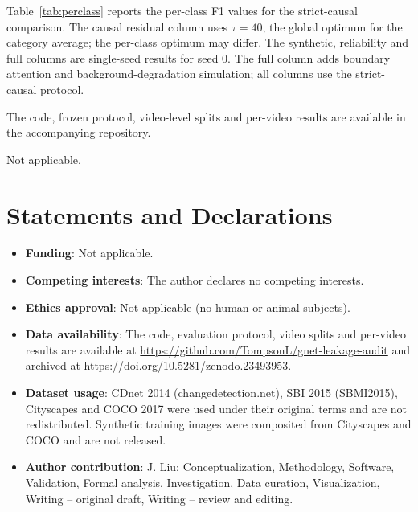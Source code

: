 \documentclass[sn-mathphys-num,iicol]{sn-jnl}
\begin{document}
Table~\ref{tab:perclass} reports the per-class F1 values for the strict-causal
comparison. The causal residual column uses $\tau=40$, the global optimum for the
category average; the per-class optimum may differ. The synthetic, reliability
and full columns are single-seed results for seed 0. The full column adds
boundary attention and background-degradation simulation; all columns use the
strict-causal protocol.

\backmatter
{}
The code, frozen protocol, video-level splits and per-video results are available
in the accompanying repository.

Not applicable.

\section*{Statements and Declarations}
\begin{itemize}
\item \textbf{Funding}: Not applicable.
\item \textbf{Competing interests}: The author declares no competing interests.
\item \textbf{Ethics approval}: Not applicable (no human or animal subjects).
\item \textbf{Data availability}: The code, evaluation protocol, video splits and
per-video results are available at \url{https://github.com/TompsonL/gnet-leakage-audit} and archived at \url{https://doi.org/10.5281/zenodo.23493953}.
\item \textbf{Dataset usage}: CDnet 2014 (changedetection.net), SBI 2015
(SBMI2015), Cityscapes and COCO 2017 were used under their original terms and
are not redistributed. Synthetic training images were composited from
Cityscapes and COCO and are not released.
\item \textbf{Author contribution}: J. Liu: Conceptualization, Methodology, Software, Validation, Formal analysis, Investigation, Data curation, Visualization, Writing -- original draft, Writing -- review and editing.
\end{itemize}


\end{document}
